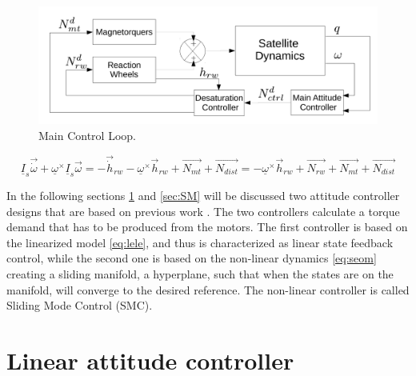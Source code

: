 \begin{figure}[h!]
	\centering 
	\includegraphics[width=160mm]{figures/mainLoop.pdf}	
	\caption{Main Control Loop.}
	\label{fig:mainLoop}
\end{figure}

		\begin{equation}
		\underline{I}_{s}\vec{\dot{\omega}} + \underline{\omega}^\times\underline{I}_{s}\vec{\omega} = -\vec{\dot{h}}_{rw} -  \underline{\omega}^\times \vec{{h}}_{rw} + \vec{N_{mt}}  + \vec{N_{dist}} =  -  \underline{\omega}^\times \vec{{h}}_{rw} + \vec{N_{rw}} + \vec{N_{mt}}  + \vec{N_{dist}} 
		\end{equation}
		





In the following sections \ref{sec:LC} and \ref{sec:SM}  will be discussed two attitude controller designs that are based on previous work \cite{PrevPro}. The two controllers calculate a torque demand that has to be produced from the motors. The first controller is based on the linearized model \eqref{eq:lele}, and thus is characterized as linear state feedback control, while the second one is based on the non-linear dynamics \eqref{eq:seom} creating a sliding manifold, a hyperplane, such that when the states are on the manifold, will converge to the desired reference. The non-linear controller is called Sliding Mode Control (SMC).

\section{Linear attitude controller} \label{sec:LC}


